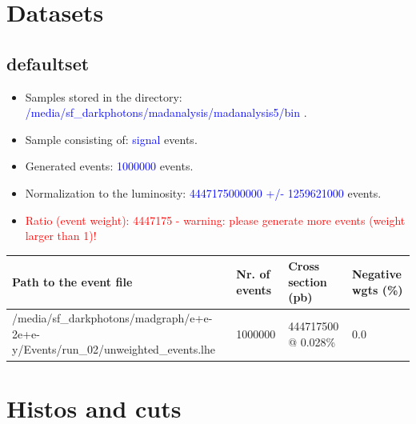 \documentclass[a4paper, 11pt]{article}
\begin{document}
\section{ Datasets}

\subsection{ defaultset}

\begin{itemize}
  \item Samples stored in the directory: \textcolor{blue}{/\-media/\-sf\_darkphotons/\-madanalysis/\-madanalysis5/\-bin} .
   \item Sample consisting of: \textcolor{blue}{signal}  events.
   \item Generated events: \textcolor{blue}{1000000 }  events.
   \item Normalization to the luminosity: \textcolor{blue}{4447175000000}\textcolor{blue}{ +/\-- }\textcolor{blue}{1259621000 }  events.
   \item\textcolor{red}{Ratio (event weight): }\textcolor{red}{4447175 }\textcolor{red}{ - warning: please generate more events (weight larger than 1)!}
\textcolor{red}{}
\end{itemize}
\begin{table}[!h]
  \begin{center}
    \begin{tabular}{|m{51.0mm}|m{24.0mm}|m{28.0mm}|m{28.0mm}|}
      \hline
      \cellcolor{yellow}         Path to the event file& \cellcolor{yellow}         Nr. of events& \cellcolor{yellow}         Cross section (pb)& \cellcolor{yellow}         Negative wgts (\%)\\
      \hline
      \cellcolor{white}          /\-media/\-sf\_darkphotons/\-madgraph/\-e+e-2e+e-y/\-Events/\-run\_02/\-unweighted\_events.lhe& \cellcolor{white}          1000000& \cellcolor{white}          444717500 @ 0.028\%& \cellcolor{white}          0.0\\
\hline
    \end{tabular}
  \end{center}
\end{table}

\newpage
\section{ Histos and cuts}
\end{document}
